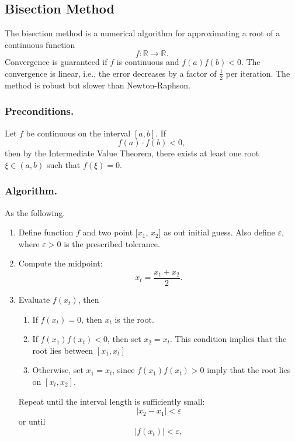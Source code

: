\documentclass[../../../main.tex]{subfiles}
\begin{document}
\subsection{Bisection Method}

The bisection method is a numerical algorithm for approximating a root of a continuous function
\[
    f : \mathbb{R} \to \mathbb{R}.
\]
Convergence is guaranteed if $f$ is continuous and $f(a)f(b)<0$.
The convergence is linear, i.e., the error decreases by a factor of $\tfrac{1}{2}$ per iteration.
The method is robust but slower than Newton-Raphson.

\subsubsection{Preconditions.}
Let $f$ be continuous on the interval $[a,b]$.
If
\[
    f(a) \cdot f(b) < 0,
\]
then by the Intermediate Value Theorem, there exists at least one root $\xi \in (a,b)$ such that $f(\xi) = 0$.

\subsubsection{Algorithm.}
As the following.
\begin{enumerate}
    \item Define function $f$ and two point $[x_1$, $x_2]$ as out initial guess. Also define $\varepsilon$, where $\varepsilon > 0$ is the prescribed tolerance.
    \item Compute the midpoint:
          \begin{equation*}
              x_t= \frac{x_1+x_2}{2}.
          \end{equation*}
    \item Evaluate $f(x_t)$, then
          \begin{enumerate}
              \item If $f(x_t) = 0$, then $x_t$ is the root.
              \item If $f(x_1) f(x_t) < 0$, then set $x_2 = x_t$. This condition implies that the root lies between $[x_1,x_t]$
              \item Otherwise, set $x_1 = x_t$, since $f(x_1)f(x_t)>0$ imply that the root lies on $[x_t,x_2]$.
          \end{enumerate}
          Repeat until the interval length is sufficiently small:
          \begin{equation*}
              |x_2 - x_1| < \varepsilon
          \end{equation*}
          or until
          \begin{equation*}
              |f(x_t)| < \varepsilon,
          \end{equation*}
\end{enumerate}
\end{document}
